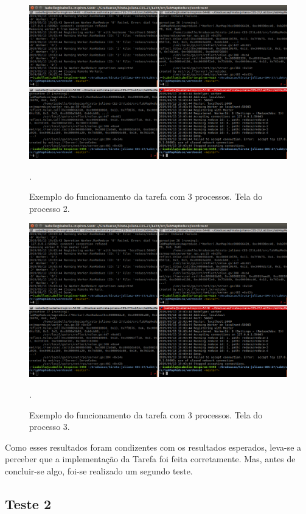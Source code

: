 \documentclass[conference]{IEEEtran}
\begin{document}
\begin{figure}[H]
\centering
\centerline{\includegraphics[scale=0.5]{imagens/tarefa_2_4_1/tarefa_2_4_1.png}}
\caption{Exemplo do funcionamento da tarefa com 3 processos. Tela do processo 2.}.
\label{ex1-proc2}
\end{figure}

\begin{figure}[H]
\centering
\centerline{\includegraphics[scale=0.5]{imagens/tarefa_2_4_1/tarefa_2_4_1.png}}
\caption{Exemplo do funcionamento da tarefa com 3 processos. Tela do processo 3.}.
\label{ex1-proc3}
\end{figure}


	Como esses resultados foram condizentes com os resultados esperados, leva-se a perceber que a implementação da Tarefa foi feita corretamente. Mas, antes de concluir-se algo, foi-se realizado um segundo teste.

\subsection{Teste 2}
\end{document}
